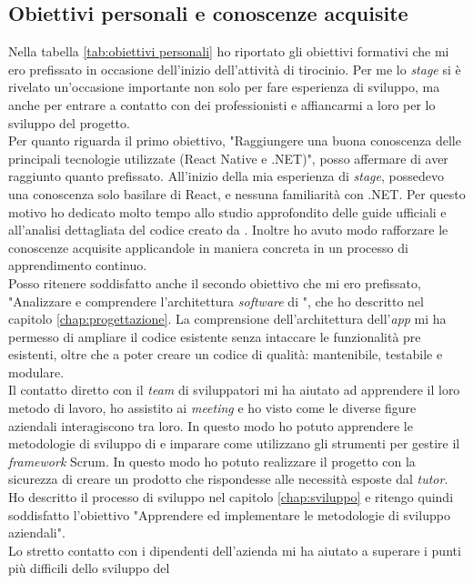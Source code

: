 \subsection{Obiettivi personali e conoscenze acquisite}
Nella tabella \ref{tab:obiettivi personali} ho riportato gli obiettivi formativi che mi ero prefissato in occasione 
dell'inizio dell'attività di tirocinio. Per me lo \textit{stage} si è rivelato un'occasione importante non solo 
per fare esperienza di sviluppo, ma anche per entrare a contatto con dei professionisti e affiancarmi a loro 
per lo sviluppo del progetto.\\
Per quanto riguarda il primo obiettivo, "Raggiungere una buona conoscenza delle principali tecnologie utilizzate 
(React Native e .NET)", posso affermare di aver raggiunto quanto prefissato. All'inizio della mia esperienza di \textit{stage},
possedevo una conoscenza solo basilare di React, e nessuna familiarità con .NET. Per questo motivo ho dedicato molto tempo 
allo studio approfondito delle guide ufficiali e all'analisi dettagliata del codice creato da {\company}. Inoltre ho 
avuto modo rafforzare le conoscenze acquisite applicandole in maniera concreta in un processo di apprendimento 
continuo.\\
Posso ritenere soddisfatto anche il secondo obiettivo che mi ero prefissato, "Analizzare e comprendere l’architettura 
\textit{software} di {\movi}", che ho descritto nel capitolo \ref{chap:progettazione}. La comprensione dell'architettura 
dell'\textit{app} mi ha permesso di ampliare il codice esistente senza intaccare le funzionalità pre esistenti, 
oltre che a poter creare un codice di qualità: mantenibile, testabile e modulare.\\
Il contatto diretto con il \textit{team} di sviluppatori mi ha aiutato ad apprendere il loro metodo di lavoro, 
ho assistito ai \textit{meeting} e ho visto come le diverse figure aziendali 
interagiscono tra loro. In questo modo ho potuto apprendere le metodologie di sviluppo di {\company} e 
imparare come utilizzano gli strumenti per gestire il \textit{framework} Scrum. In questo modo ho potuto 
realizzare il progetto con la sicurezza di creare un prodotto che rispondesse alle necessità esposte dal \textit{tutor}.
Ho descritto il processo di sviluppo nel capitolo \ref{chap:sviluppo} e ritengo quindi soddisfatto l'obiettivo 
"Apprendere ed implementare le metodologie di sviluppo aziendali".\\
Lo stretto contatto con i dipendenti dell'azienda mi ha aiutato a superare i punti più difficili dello sviluppo del 
